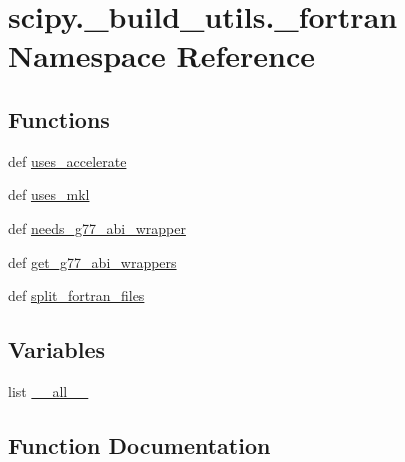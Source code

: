 \hypertarget{namespacescipy_1_1__build__utils_1_1__fortran}{}\section{scipy.\+\_\+build\+\_\+utils.\+\_\+fortran Namespace Reference}
\label{namespacescipy_1_1__build__utils_1_1__fortran}
\subsection*{Functions}
\begin{DoxyCompactItemize}
\item 
def \hyperlink{namespacescipy_1_1__build__utils_1_1__fortran_afa1f34293248de7d5e9b011cb7c1eb23}{uses\+\_\+accelerate}
\item 
def \hyperlink{namespacescipy_1_1__build__utils_1_1__fortran_a9f5ca42d50fd389ba8fcc4c12c52bdca}{uses\+\_\+mkl}
\item 
def \hyperlink{namespacescipy_1_1__build__utils_1_1__fortran_a4dbda371afd2e3d6594151541a09d402}{needs\+\_\+g77\+\_\+abi\+\_\+wrapper}
\item 
def \hyperlink{namespacescipy_1_1__build__utils_1_1__fortran_a7cb694d0acbf54086e83f719f6d29a47}{get\+\_\+g77\+\_\+abi\+\_\+wrappers}
\item 
def \hyperlink{namespacescipy_1_1__build__utils_1_1__fortran_a42822289777d746102898b88864dc805}{split\+\_\+fortran\+\_\+files}
\end{DoxyCompactItemize}
\subsection*{Variables}
\begin{DoxyCompactItemize}
\item 
list \hyperlink{namespacescipy_1_1__build__utils_1_1__fortran_a7e2fc5ee792d1046c5ca1afc0aa36cc1}{\+\_\+\+\_\+all\+\_\+\+\_\+}
\end{DoxyCompactItemize}


\subsection{Function Documentation}
\hypertarget{namespacescipy_1_1__build__utils_1_1__fortran_a7cb694d0acbf54086e83f719f6d29a47}{}
